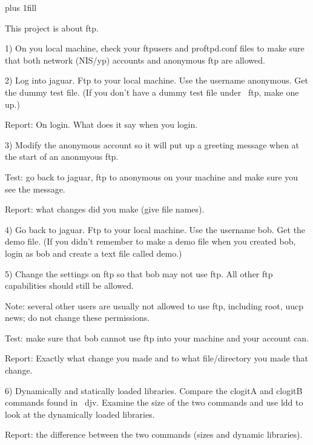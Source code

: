 
\rightskip=0pt plus 1fill

\parindent 0pt

This project is about ftp.

1) On you local machine, check your {\ltt{}ftpusers}
and {\ltt{}proftpd.conf} files to make sure that
both network (NIS/yp) accounts and anonymous ftp
are allowed.

2) Log into jaguar.
Ftp to your local machine.
Use the username anonymous.
Get the dummy test file.
(If you don't have a dummy test file under {\ltt{}~ftp}, make one up.)

Report: On login. What does it say when you login.


3) Modify the anonymous account so it
will put up a greeting message when at the start of
an anonmyous ftp.

Test: go back to jaguar, ftp to anonymous on your machine
and make sure you see the message.

Report: what changes did you make (give file names).

4) Go back to jaguar.
Ftp to your local machine.
Use the username bob.
Get the {\ltt{}demo} file.
(If you didn't remember to make a demo file when you created
bob, login as bob and create a text file called demo.)

5) Change the settings on ftp so that {\ltt{}bob} may not use ftp.
All other ftp capabilities should still be allowed.

Note: several other users are usually not allowed to use ftp, including {\ltt{}root}, {\ltt{}uucp}
{\ltt{}news}; do not change these permissions.

Test: make sure that {\ltt{}bob} cannot use ftp into your machine and your
account can.

Report: Exactly what change you made and to what
file/directory you made that change.

6) Dynamically and statically loaded libraries.
Compare the {\ltt{}clogitA} and {\ltt{}clogitB} commands found in {\ltt{}~djv}.
Examine the size of the two commands
and use {\ltt{}ldd} to look at the dynamically loaded libraries.

Report: the difference between the two commands (sizes and dynamic libraries).
\bye
